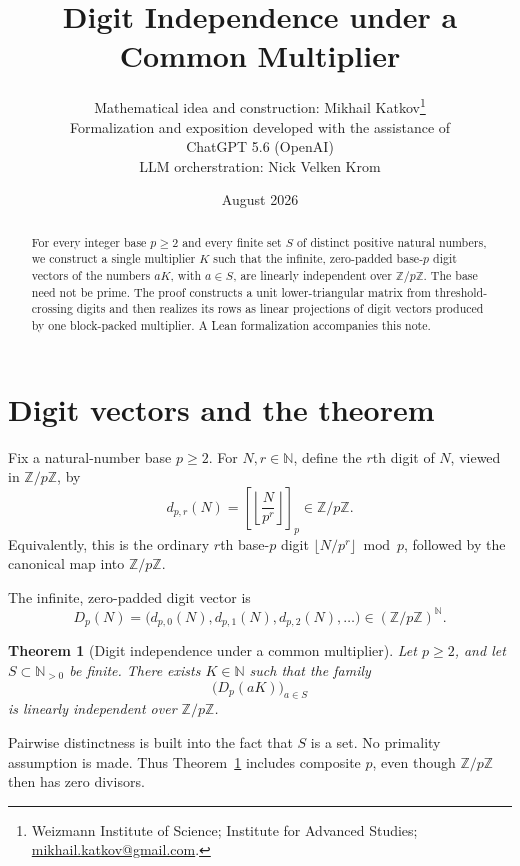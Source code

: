 \documentclass[11pt]{article}
\title{Digit Independence under a Common Multiplier}
\author{Mathematical idea and construction: Mikhail Katkov\thanks{Weizmann Institute of Science; Institute for Advanced Studies; \href{mailto:mikhail.katkov@gmail.com}{mikhail.katkov@gmail.com}.}\\
  \small Formalization and exposition developed with the assistance of\\
  \small ChatGPT 5.6 (OpenAI)  \\
  \small LLM orcherstration: Nick Velken Krom}
\date{August 2026}
\newtheorem{theorem}{Theorem}
\newcommand{\N}{\mathbb{N}}
\newcommand{\Z}{\mathbb{Z}}
\newcommand{\Zmod}[1]{\Z/#1\Z}
\newcommand{\digit}{d}
\newcommand{\digits}{D}
\begin{document}
\maketitle

\begin{abstract}
For every integer base $p\ge 2$ and every finite set $S$ of distinct positive
natural numbers, we construct a single multiplier $K$ such that the infinite,
zero-padded base-$p$ digit vectors of the numbers $aK$, with $a\in S$, are
linearly independent over $\Zmod p$. The base need not be prime. The proof
constructs a unit lower-triangular matrix from threshold-crossing digits and
then realizes its rows as linear projections of digit vectors produced by one
block-packed multiplier. A Lean formalization accompanies this note.
\end{abstract}

\section{Digit vectors and the theorem}

Fix a natural-number base $p\ge 2$. For $N,r\in\N$, define the $r$th digit of
$N$, viewed in $\Zmod p$, by
\begin{equation}
  \digit_{p,r}(N)
  =
  \left[
    \left\lfloor \frac{N}{p^r}\right\rfloor
  \right]_p
  \in \Zmod p.
  \label{eq:digit}
\end{equation}
Equivalently, this is the ordinary $r$th base-$p$ digit
$\lfloor N/p^r\rfloor\bmod p$, followed by the canonical map into
$\Zmod p$.

The infinite, zero-padded digit vector is
\begin{equation}
  \digits_p(N)
  =
  \bigl(
    \digit_{p,0}(N),\digit_{p,1}(N),\digit_{p,2}(N),\ldots
  \bigr)
  \in (\Zmod p)^{\N}.
  \label{eq:digit-vector}
\end{equation}

\begin{theorem}[Digit independence under a common multiplier]
\label{thm:main}
Let $p\ge 2$, and let $S\subset\N_{>0}$ be finite. There exists $K\in\N$
such that the family
\[
  \bigl(\digits_p(aK)\bigr)_{a\in S}
\]
is linearly independent over $\Zmod p$.
\end{theorem}

Pairwise distinctness is built into the fact that $S$ is a set. No primality
assumption is made. Thus Theorem~\ref{thm:main} includes composite $p$, even
though $\Zmod p$ then has zero divisors.
\end{document}
